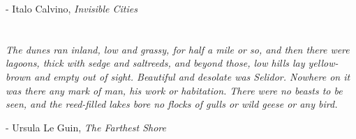 \documentclass[10pt]{article}
\begin{document}
\begin{textblock}{11}
- Italo Calvino, \emph{Invisible Cities}

\section{}

\textit{The dunes ran inland, low and grassy, for half a mile or so, and then
there were lagoons, thick with sedge and saltreeds, and beyond those, low hills
lay yellow-brown and empty out of sight. Beautiful and desolate was Selidor.
Nowhere on it was there any mark of man, his work or habitation. There were no
beasts to be seen, and the reed-filled lakes bore no flocks of gulls or wild
geese or any bird. }

- Ursula Le Guin, \emph{The Farthest Shore}

\end{textblock}
\end{document}
